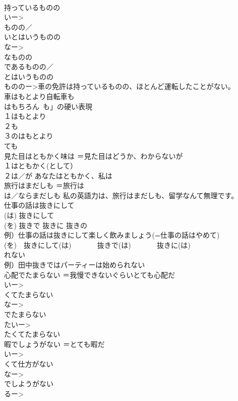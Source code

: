 \documentclass[8pt]{extreport}
\begin{document}
\begin{CJK}{UTF8}{min}
\\	持っているものの	
\\	いー>
\\	ものの／
\\	いとはいうものの 
\\	なー>
\\	なものの 
\\	であるものの／
\\	とはいうものの 
\\	もののー>車の免許は持っているものの、ほとんど運転したことがない。
\\	車はもとより自転車も	
\\	はもちろん~も」の硬い表現 
\\	１はもとより
\\	２も 
\\	３のはもとより
\\	ても
\\	見た目はともかく味は	＝見た目はどうか、わからないが 
\\	１はともかく(として）
\\	２は／が あなたはともかく、私は 
\\	旅行はまだしも	＝旅行は 
\\	は／ならまだしも 私の英語力は、旅行はまだしも、留学なんて無理です。
\\	仕事の話は抜きにして	
\\	(は) 抜きにして 
\\	(を) 抜きで 抜きに 抜きの
\\	例）仕事の話は抜きにして楽しく飲みましょう(=仕事の話はやめて) 
\\	(を)　抜きにして(は) 　　　 抜きで(は) 　　　 抜きに(は) 
\\	れない 
\\	例）田中抜きではパーティーは始められない
\\	心配でたまらない	＝我慢できないぐらいとても心配だ 
\\	いー>
\\	くてたまらない 
\\	なー>
\\	でたまらない 
\\	たいー>
\\	たくてたまらない
\\	暇でしょうがない	＝とても暇だ 
\\	いー>
\\	くて仕方がない 
\\	なー>
\\	でしようがない 
\\	るー>

\end{CJK}
\end{document}
